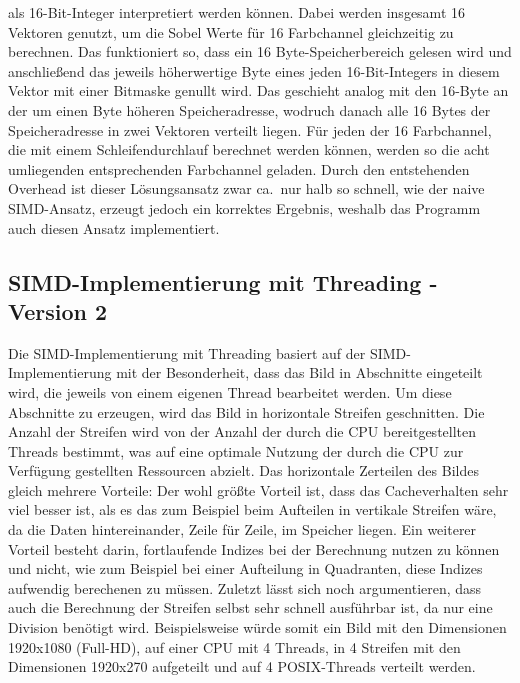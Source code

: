 \documentclass[course=erap]{aspdoc}
\begin{document}
als 16-Bit-Integer interpretiert werden können.
Dabei werden insgesamt 16 Vektoren genutzt, um die Sobel Werte für 16 Farbchannel gleichzeitig zu berechnen.
Das funktioniert so, dass ein 16 Byte-Speicherbereich gelesen wird und anschließend das jeweils höherwertige Byte eines jeden
16-Bit-Integers in diesem Vektor mit einer Bitmaske genullt wird.
Das geschieht analog mit den 16-Byte an der um einen Byte höheren Speicheradresse, wodruch danach alle 16 Bytes der Speicheradresse in zwei Vektoren verteilt liegen.
Für jeden der 16 Farbchannel, die mit einem Schleifendurchlauf berechnet werden können, werden so die acht umliegenden entsprechenden Farbchannel geladen.
Durch den entstehenden Overhead ist dieser Lösungsansatz zwar ca.\ nur halb so schnell, wie der naive SIMD-Ansatz, erzeugt jedoch ein korrektes Ergebnis, weshalb das Programm auch diesen Ansatz implementiert.

\subsection{SIMD-Implementierung mit Threading - Version 2}
\label{subsec:simd-threading}
Die SIMD-Implementierung mit Threading basiert auf der SIMD-Implementierung mit der Besonderheit, dass das Bild in Abschnitte eingeteilt wird, die jeweils von einem eigenen Thread bearbeitet werden.
Um diese Abschnitte zu erzeugen, wird das Bild in horizontale Streifen geschnitten.
Die Anzahl der Streifen wird von der Anzahl der durch die CPU bereitgestellten Threads bestimmt, was auf eine optimale Nutzung der durch die CPU zur Verfügung gestellten Ressourcen abzielt.
Das horizontale Zerteilen des Bildes gleich mehrere Vorteile:
Der wohl größte Vorteil ist, dass das Cacheverhalten sehr viel besser ist, als es das zum Beispiel beim Aufteilen in vertikale Streifen wäre, da die Daten hintereinander, Zeile für Zeile, im Speicher liegen.
Ein weiterer Vorteil besteht darin, fortlaufende Indizes bei der Berechnung nutzen zu können und nicht, wie zum Beispiel bei einer Aufteilung in Quadranten, diese Indizes aufwendig berechenen zu müssen.
Zuletzt lässt sich noch argumentieren, dass auch die Berechnung der Streifen selbst sehr schnell ausführbar ist, da nur eine Division benötigt wird.
Beispielsweise würde somit ein Bild mit den Dimensionen 1920x1080 (Full-HD), auf einer CPU mit 4 Threads, in 4 Streifen mit den Dimensionen 1920x270 aufgeteilt und auf 4 POSIX-Threads verteilt werden.
\end{document}
